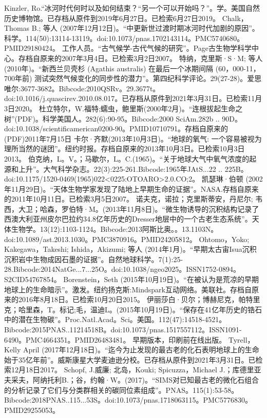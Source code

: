 \begin{enumerate}
 Kinzler, Ro.“冰河时代何时以及如何结束？“另一个可以开始吗？”。学。美国自然历史博物馆。已存档从原件到2019年6月27日。已检索6月27日2019。
 Chalk，Thomas B.; 等人 (2007年12月12日)。“中更新世过渡时期冰河时代加剧的原因”。科学。114(50):13114-13119。doi:10.1073/pnas.1702143114。PMC5740680。PMID29180424。  
 工作人员。“古气候学-古代气候的研究”。Page古生物学科学中心。存档自原来的2007年3月4日。已检索3月2日2007。
 特纳，克里斯·S·M; 等人 (2010年)。“新西兰贝壳杉 (Agathis australis) 在最后一个冰期间隔 (60，000-11，700年前) 测试突然气候变化的同步性的潜力”。第四纪科学评论。29(27-28)。爱思唯尔:3677-3682。Bibcode:2010QSRv。29.3677t。doi:10.1016/j.quascirev.2010.08.017。已存档从原件到2021年3月31日。已检索11月3日2020。
 杜立特尔，W.福特;蠕虫，鲍里斯(2000年2月)。“连根拔起生命之树”(PDF)。科学美国人。282(6):90-95。Bibcode:2000 SciAm.282b .. 90D。doi:10.1038/scientificamerican0200-90。PMID10710791。存档自原来的(PDF)2011年7月15日  
 卡尔·齐默(2013年10月3日)。“地球的氧气: 一个容易被视为理所当然的谜团”。纽约时报。存档自原来的2013年10月3日。已检索10月3日2013。
 伯克纳，L。V。；马歇尔，L。C.(1965)。“关于地球大气中氧气浓度的起源和上升”。大气科学杂志。22(3):225-261.Bibcode:1965年JAtS...22 .. 225B。doi:10.1175/1520-0469(1965)022<0225:OTOARO>2.0.CO;2。
 凯瑟琳·伯顿 (2002年11月29日)。“天体生物学家发现了陆地上早期生命的证据”。NASA.存档自原来的2011年10月11日。已检索3月5日2007。
 诺夫克，诺拉；克里斯蒂安，丹尼尔; 韦西，大卫；哈森，罗伯特·M。(2013年11月8日)。“微生物诱导的沉积结构记录了西澳大利亚州皮尔巴拉约34.8亿年历史的Dresser地层中的一个古老生态系统”。天体生物学。13(12):1103-1124。Bibcode:2013阿斯比奥。。13.1103N。doi:10.1089/ast.2013.1030。PMC3870916。PMID24205812。  
 Ohtomo，Yoko; Kakegawa，Takeshi; Ishida，Akizumi; 等人 (2014年1月)。“早期太古宙Isua沉积沉积岩中生物成因石墨的证据”。自然地球科学。7(1):25-28.Bibcode:2014NatGe...7...25O。doi:10.1038/ngeo2025。ISSN1752-0894。S2CID54767854。  
 Borenstein，Seth (2015年10月19日)。“在被认为是荒凉的早期地球上的生命暗示”。激发。纽约扬克斯:Mindspark互动网络。美联社。存档自原来的2016年8月18日。已检索10月20日2015。
 伊丽莎白·贝尔；博赫尼克，帕特里克；哈里森，T。标记;毛，温迪L。(2015年10月19日)。“保存在41亿年历史的锆石中的潜在生物碳”。Proc.Natl.Acad。Sci。美国。112(47):14518-4521。Bibcode:2015PNAS..11214518B。doi:10.1073/pnas.1517557112。ISSN1091-6490。PMC4664351。PMID26483481。   早期版本，印刷前在线出版。
 Tyrell，Kelly April (2017年12月18日)。“迄今为止发现的最古老的化石表明地球上的生命始于35亿年前”。威斯康星大学麦迪逊分校。已存档从原件到2021年3月31日。已检索12月18日2017。
 Schopf, J.威廉; 北岛，Kouki; Spicuzza，Michael J.；库德里亚夫采夫，阿纳托利B.；谷，约翰·W。(2017)。“SIMS对已知最古老的微化石组合的分析记录了它们与分类群相关的碳同位素组成”。PNAS。115(1):53-58。Bibcode:2018PNAS..115...53S。doi:10.1073/pnas.1718063115。PMC5776830。PMID29255053。  

\end{enumerate}

